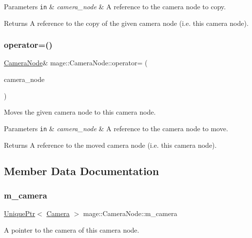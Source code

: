 \begin{DoxyParams}[1]{Parameters}
\mbox{\tt in}  & {\em camera\+\_\+node} & A reference to the camera node to copy. \\
\hline
\end{DoxyParams}
\begin{DoxyReturn}{Returns}
A reference to the copy of the given camera node (i.\+e. this camera node). 
\end{DoxyReturn}
\hypertarget{classmage_1_1_camera_node_a8da019549eeac6c4d7d6d7c4017dd498}{}\label{classmage_1_1_camera_node_a8da019549eeac6c4d7d6d7c4017dd498} 
\subsubsection{\texorpdfstring{operator=()}{operator=()}\hspace{0.1cm}{\footnotesize\ttfamily [2/2]}}
{\footnotesize\ttfamily \hyperlink{classmage_1_1_camera_node}{Camera\+Node}\& mage\+::\+Camera\+Node\+::operator= (\begin{DoxyParamCaption}\item[{\hyperlink{classmage_1_1_camera_node}{Camera\+Node} \&\&}]{camera\+\_\+node }\end{DoxyParamCaption})\hspace{0.3cm}{\ttfamily [delete]}}

Moves the given camera node to this camera node.


\begin{DoxyParams}[1]{Parameters}
\mbox{\tt in}  & {\em camera\+\_\+node} & A reference to the camera node to move. \\
\hline
\end{DoxyParams}
\begin{DoxyReturn}{Returns}
A reference to the moved camera node (i.\+e. this camera node). 
\end{DoxyReturn}


\subsection{Member Data Documentation}
\hypertarget{classmage_1_1_camera_node_a18f00f7ccd0c677043e11a1b3085dbfb}{}\label{classmage_1_1_camera_node_a18f00f7ccd0c677043e11a1b3085dbfb} 
\subsubsection{\texorpdfstring{m\+\_\+camera}{m\_camera}}
{\footnotesize\ttfamily \hyperlink{namespacemage_a8c307fbcc33bce9b7f2aa4c26c3b95cf}{Unique\+Ptr}$<$ \hyperlink{classmage_1_1_camera}{Camera} $>$ mage\+::\+Camera\+Node\+::m\+\_\+camera\hspace{0.3cm}{\ttfamily [private]}}

A pointer to the camera of this camera node. 